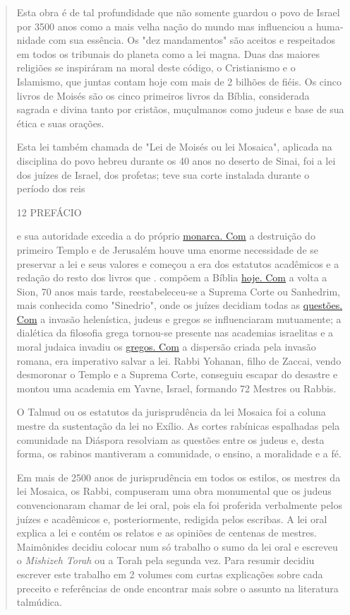 \begin{quote}
Esta obra é de tal profundidade que não somente guardou o povo de Israel
por 3500 anos como a mais velha nação do mundo mas influenciou a
huma­nidade com sua essência. Os "dez mandamentos" são aceitos e
respeitados em to­dos os tribunais do planeta como a lei magna. Duas das
maiores religiões se inspirá­ram na moral deste código, o Cristianismo e
o Islamismo, que juntas contam hoje com mais de 2 bilhões de fiéis. Os
cinco livros de Moisés são os cinco primeiros livros da Bíblia,
considerada sagrada e divina tanto por cristãos, muçulmanos como judeus
e base de sua ética e suas orações.

Esta lei também chamada de "Lei de Moisés ou lei Mosaica", aplicada na
disciplina do povo hebreu durante os 40 anos no deserto de Sinai, foi a
lei dos juízes de Israel, dos profetas; teve sua corte instalada durante
o período dos reis

12 PREFÁCIO

e sua autoridade excedia a do próprio
\href{http://monarca.Com}{{monarca. Com}} a destruição do primeiro
Tem­plo e de Jerusalém houve uma enorme necessidade de se preservar a
lei e seus valo­res e começou a era dos estatutos acadêmicos e a redação
do resto dos livros que . compõem a Bíblia \href{http://hoje.Com}{{hoje.
Com}} a volta a Sion, 70 anos mais tarde, reestabeleceu-se a Suprema
Corte ou Sanhedrim, mais conhecida como "Sinedrio", onde os juízes
decidiam todas as \href{http://questões.Com}{{questões. Com}} a invasão
helenística, judeus e gregos se influen­ciaram mutuamente; a dialética
da filosofia grega tornou-se presente nas academias israelitas e a moral
judaica invadiu os \href{http://gregos.Com}{{gregos. Com}} a dispersão
criada pela invasão romana, era imperativo salvar a lei. Rabbi Yohanan,
filho de Zaccai, vendo desmo­ronar o Templo e a Suprema Corte, conseguiu
escapar do desastre e montou uma academia em Yavne, Israel, formando 72
Mestres ou Rabbis.

O Talmud ou os estatutos da jurisprudência da lei Mosaica foi a coluna
mestre da sustentação da lei no Exílio. As cortes rabínicas espalhadas
pela comuni­dade na Diáspora resolviam as questões entre os judeus e,
desta forma, os rabinos mantiveram a comunidade, o ensino, a moralidade
e a fé.

Em mais de 2500 anos de jurisprudência em todos os estilos, os mestres
da lei Mosaica, os Rabbi, compuseram uma obra monumental que os judeus
con­vencionaram chamar de lei oral, pois ela foi proferida verbalmente
pelos juízes e acadêmicos e, posteriormente, redigida pelos escribas. A
lei oral explica a lei e con­tém os relatos e as opiniões de centenas de
mestres. Maimônides decidiu colocar num só trabalho o sumo da lei oral e
escreveu o \emph{Mishizeh Torah} ou a Torah pela segunda vez. Para
resumir decidiu escrever este trabalho em 2 volumes com curtas
explicações sobre cada preceito e referências de onde encontrar mais
sobre o as­sunto na literatura talmúdica.


\end{quote}
